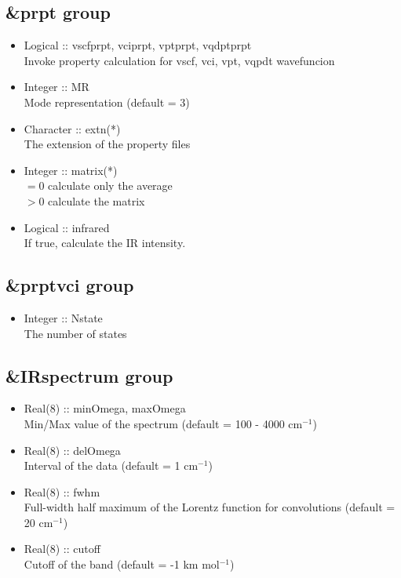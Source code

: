 \documentclass[a4paper,12pt]{article}
\begin{document}
\subsection{\&prpt group}
   \begin{itemize}
     \item Logical :: vscfprpt, vciprpt, vptprpt, vqdptprpt \\
       Invoke property calculation for vscf, vci, vpt, vqpdt wavefuncion
     \item Integer :: MR \\
       Mode representation (default = 3)
     \item Character :: extn(*) \\
       The extension of the property files
     \item Integer :: matrix(*) \\
       $=0$ calculate only the average \\
       $>0$ calculate the matrix
     \item Logical :: infrared \\
       If true, calculate the IR intensity.
   \end{itemize}

\subsection{\&prptvci group}
   \begin{itemize} 
     \item Integer :: Nstate \\
       The number of states
   \end{itemize}

\subsection{\&IRspectrum group}
   \begin{itemize} 
     \item Real(8) :: minOmega, maxOmega \\
       Min/Max value of the spectrum (default = 100 - 4000 cm$^{-1}$)
     \item Real(8) :: delOmega \\
       Interval of the data (default = 1 cm$^{-1}$)
     \item Real(8) :: fwhm \\
       Full-width half maximum of the Lorentz function for convolutions (default = 20 cm$^{-1}$)
     \item Real(8) :: cutoff \\
       Cutoff of the band (default = -1 km mol$^{-1}$)
   \end{itemize}
\end{document}
